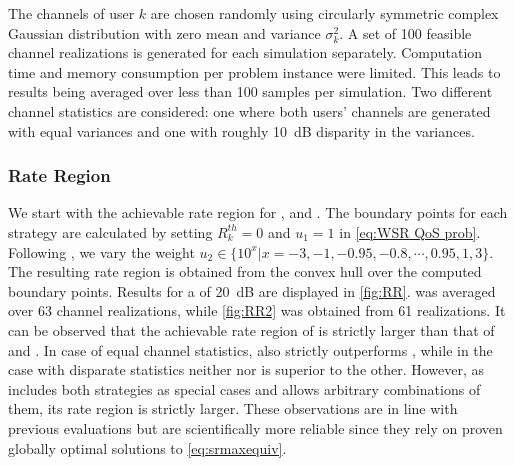 \documentclass[a4paper,10pt,journal]{IEEEtran}
\begin{document}
The channels of user $k$ are chosen randomly using circularly symmetric complex Gaussian distribution with zero mean and variance $\sigma_k^2$. A set of 100  feasible channel realizations is generated for each simulation separately. Computation time and memory consumption per problem instance were limited. This leads to results being averaged over less than 100 samples per simulation. Two different channel statistics are considered: one where both users' channels are generated with equal variances and one with roughly \SI{10}{\dB} disparity in the variances.

\subsubsection{Rate Region}
We start with the achievable rate region for ,  and . The boundary points for each strategy are calculated by setting $R_k^{th} = 0$ and $u_1 = 1$ in \cref{eq:WSR QoS prob}. Following \cite{wmmse2008}, we vary the weight $u_2 \in \{10^x | x = -3, -1, -0.95, -0.8, \cdots, 0.95, 1, 3 \}$. The resulting rate region is obtained from the convex hull over the computed boundary points. Results for a  of \SI{20}{\dB} are displayed in \cref{fig:RR}.  was averaged over 63 channel realizations, while \cref{fig:RR2} was obtained from 61 realizations. It can be observed that the achievable rate region of  is strictly larger than that of  and . In case of equal channel statistics,  also strictly outperforms , while in the case with disparate statistics neither  nor  is superior to the other. However, as  includes both strategies as special cases and allows arbitrary combinations of them, its rate region is strictly larger. These observations are in line with previous evaluations \cite{mao2017eurasip} but are scientifically more reliable since they rely on proven globally optimal solutions to \cref{eq:srmaxequiv}.
\end{document}
